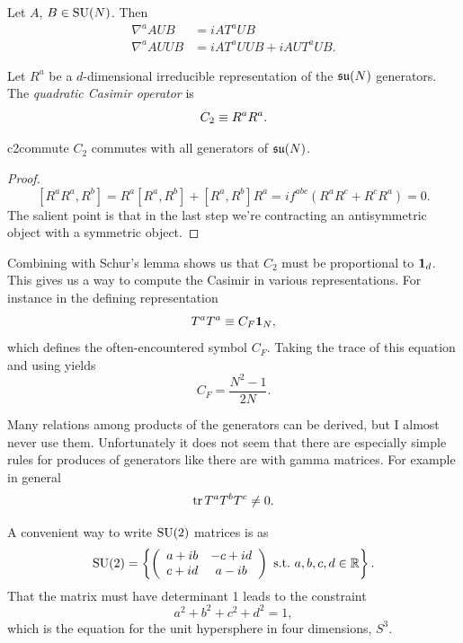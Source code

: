 \begin{example*}{}{}
Let $A$, $B\in\operatorname{SU}(N)$. Then
\begin{equation*}\begin{aligned}
\nabla^a AUB&=iAT^aUB\\
\nabla^a AUUB&=iAT^aUUB + iAUT^aUB.
\end{aligned}\end{equation*}
\end{example*}

Let $R^a$ be a $d$-dimensional irreducible representation of the
$\operatorname{\mathfrak{su}}(N)$ generators. The {\it quadratic Casimir operator}
is
\begin{equation}\index{eq:quadCasimir}
C_2\equiv R^a R^a.
\end{equation}

\begin{proposition}{}{c2commute}
$C_2$ commutes with all generators of $\operatorname{\mathfrak{su}}(N)$.
\begin{proof}
$$
\left[R^a R^a, R^b\right]=R^a\left[R^a, R^b\right]+\left[R^a, R^b\right] R^a=i
f^{a b c}\left(R^a R^c+R^c R^a\right)=0.
$$
The salient point is that in the last step we're contracting an antisymmetric
object with a symmetric object.
\end{proof}
\end{proposition}
Combining  with Schur's lemma shows us that
$C_2$ must be proportional to ${\mathbf 1}_d$. This gives us a way
to compute the Casimir in various representations. For
instance in the defining representation
\begin{equation}
T^aT^a\equiv C_F{\mathbf 1}_N,
\end{equation}
which defines the often-encountered symbol $C_F$.
Taking the trace of this equation and using
 yields
\begin{equation}\label{eq:casfund}
C_F=\frac{N^2-1}{2N}.
\end{equation}

Many relations among products of the generators can be derived, but
I almost never use them. Unfortunately it does not seem that there
are especially simple rules for produces of generators like there
are with gamma matrices. For example in general
\begin{equation}
\tr T^aT^bT^c\neq0.
\end{equation}

A convenient way to write $\operatorname{SU}(2)$ matrices is as
\begin{equation}
\operatorname{SU}(2)=\left\{
\left(\begin{array}{cc}
          a+ib   & -c+id  \\ 
          c+id   &  a-ib  \\
            \end{array}\right)~\text{s.t.}~ a,b,c,d\in\mathbb{R} \right\}.
\end{equation} 
That the matrix must have determinant 1 leads to the constraint
\begin{equation}
a^2+b^2+c^2+d^2=1,
\end{equation} 
which is the equation for the unit hypersphere in four dimensions, $S^3$. 

